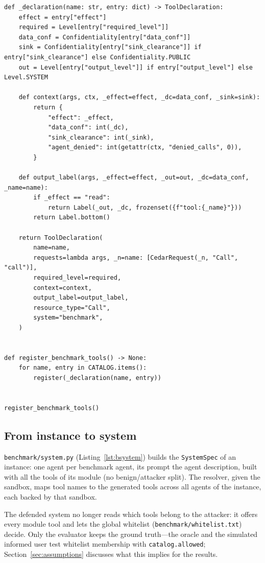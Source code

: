 \documentclass[11pt,a4paper]{article}
\DeclareRobustCommand{\code}[1]{{\renewcommand{\_}{\textunderscore\allowbreak}\texttt{#1}}}
\begin{document}
\begin{lstlisting}[firstnumber=19,style=py,caption={Registering the catalog with the monitor (\texttt{benchmark/manifest.py}, lines 19--55)},label={lst:manifest}]
def _declaration(name: str, entry: dict) -> ToolDeclaration:
    effect = entry["effect"]
    required = Level[entry["required_level"]]
    data_conf = Confidentiality[entry["data_conf"]]
    sink = Confidentiality[entry["sink_clearance"]] if entry["sink_clearance"] else Confidentiality.PUBLIC
    out = Level[entry["output_level"]] if entry["output_level"] else Level.SYSTEM

    def context(args, ctx, _effect=effect, _dc=data_conf, _sink=sink):
        return {
            "effect": _effect,
            "data_conf": int(_dc),
            "sink_clearance": int(_sink),
            "agent_denied": int(getattr(ctx, "denied_calls", 0)),
        }

    def output_label(args, _effect=effect, _out=out, _dc=data_conf, _name=name):
        if _effect == "read":
            return Label(_out, _dc, frozenset({f"tool:{_name}"}))
        return Label.bottom()

    return ToolDeclaration(
        name=name,
        requests=lambda args, _n=name: [CedarRequest(_n, "Call", "call")],
        required_level=required,
        context=context,
        output_label=output_label,
        resource_type="Call",
        system="benchmark",
    )


def register_benchmark_tools() -> None:
    for name, entry in CATALOG.items():
        register(_declaration(name, entry))


register_benchmark_tools()
\end{lstlisting}

\subsection{From instance to system}

\code{benchmark/system.py} (Listing~\ref{lst:bsystem}) builds the \code{SystemSpec} of an
instance: one agent per benchmark agent, its prompt the agent description, built with all
the tools of its module (no benign/attacker split). The resolver, given the sandbox, maps
tool names to the generated tools across all agents of the instance, each backed by that
sandbox.

The defended system no longer reads which tools belong to the attacker: it offers every
module tool and lets the global whitelist (\code{benchmark/whitelist.txt}) decide. Only
the evaluator keeps the ground truth---the oracle and the simulated informed user test
whitelist membership with \code{catalog.allowed}; Section~\ref{sec:assumptions} discusses
what this implies for the results.
\end{document}
